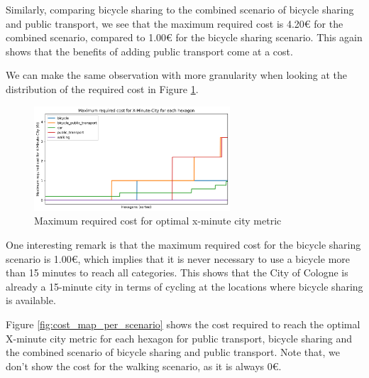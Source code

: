 Similarly, comparing bicycle sharing to the combined scenario of bicycle sharing and public transport, we see that the maximum required cost is 4.20€ for the combined scenario, compared to 1.00€ for the bicycle sharing scenario.
This again shows that the benefits of adding public transport come at a cost.

We can make the same observation with more granularity when looking at the distribution of the required cost in Figure \ref{fig:maximum_required_cost_for_x_minute_city}.

\begin{figure}
  \begin{center}
    \includegraphics[width=0.65\textwidth]{Figures/results/cost/maximum_required_cost_for_x_minute_city}
  \end{center}
  \caption{Maximum required cost for optimal x-minute city metric}
  \label{fig:maximum_required_cost_for_x_minute_city}
\end{figure}

One interesting remark is that the maximum required cost for the bicycle sharing scenario is 1.00€, which implies that it is never necessary to use a bicycle more than 15 minutes to reach all categories.
This shows that the City of Cologne is already a 15-minute city in terms of cycling at the locations where bicycle sharing is available.


Figure \ref{fig:cost_map_per_scenario} shows the cost required to reach the optimal X-minute city metric for each hexagon for public transport, bicycle sharing and the combined scenario of bicycle sharing and public transport.
Note that, we don't show the cost for the walking scenario, as it is always 0€.

